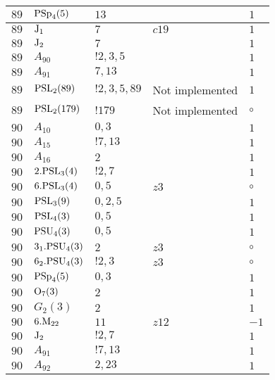 \documentclass[a4paper, 11pt]{article}
\begin{document}
\begin{longtable}{lllll}
        $ 89 $ & $ {\rm PSp}_{4}(5) $ & $ 13 $ & $ ~ $ & $ 1$ \\ \hline
        $ 89 $ & $ {\rm J}_1 $ & $ 7 $ & $ c19 $ & $ 1$ \\ \hline
        $ 89 $ & $ {\rm J}_2 $ & $ 7 $ & $ ~ $ & $ 1$ \\ \hline
        $ 89 $ & $ A_{90} $ & $ !2, 3, 5 $ & $ ~ $ & $ 1$ \\ \hline
        $ 89 $ & $ A_{91} $ & $ 7, 13 $ & $ ~ $ & $ 1$ \\ \hline
        $ 89 $ & $ {\rm PSL}_{2}(89) $ & $ !2, 3, 5, 89 $ &  Not implemented & $ 1$ \\ \hline
        $ 89 $ & $ {\rm PSL}_{2}(179) $ & $ !179 $ &  Not implemented &  $\circ$ \\ \hline
        $ 90 $ & $ A_{10} $ & $ 0,3 $ & $ ~ $ & $ 1$ \\ \hline
        $ 90 $ & $ A_{15} $ & $ ! 7,13 $ & $ ~ $ & $ 1$ \\ \hline
        $ 90 $ & $ A_{16} $ & $ 2 $ & $ ~ $ & $ 1$ \\ \hline
        $ 90 $ & $ 2.{\rm PSL}_{3}(4) $ & $ ! 2,7 $ & $ ~ $ & $ 1$ \\ \hline
        $ 90 $ & $ 6.{\rm PSL}_{3}(4) $ & $ 0,5 $ & $ z3 $ &  $\circ$ \\ \hline
        $ 90 $ & $ {\rm PSL}_{3}(9) $ & $ 0, 2, 5 $ & $ ~ $ & $ 1$ \\ \hline
        $ 90 $ & $ {\rm PSL}_{4}(3) $ & $ 0,5 $ & $ ~ $ & $ 1$ \\ \hline
        $ 90 $ & $ {\rm PSU}_{4}(3) $ & $ 0,5 $ & $ ~ $ & $ 1$ \\ \hline
        $ 90 $ & $ 3_1.{\rm PSU}_{4}(3) $ & $ 2 $ & $ z3 $ &  $\circ$ \\ \hline
        $ 90 $ & $ 6_2.{\rm PSU}_{4}(3) $ & $ ! 2,3 $ & $ z3 $ &  $\circ$ \\ \hline
        $ 90 $ & $ {\rm PSp}_{4}(5) $ & $ 0,3 $ & $ ~ $ & $ 1$ \\ \hline
        $ 90 $ & $ {\rm O}_{7}(3) $ & $ 2 $ & $ ~ $ & $ 1$ \\ \hline
        $ 90 $ & $ G_{2}(3) $ & $ 2 $ & $ ~ $ & $ 1$ \\ \hline
        $ 90 $ & $ 6.{\rm M}_{22} $ & $ 11 $ & $ z12 $ & $ -1$ \\ \hline
        $ 90 $ & $ {\rm J}_2 $ & $ ! 2,7 $ & $ ~ $ & $ 1$ \\ \hline
        $ 90 $ & $ A_{91} $ & $ !7, 13 $ & $ ~ $ & $ 1$ \\ \hline
        $ 90 $ & $ A_{92} $ & $ 2, 23 $ & $ ~ $ & $ 1$ \\ \hline

\end{longtable}
\end{document}
